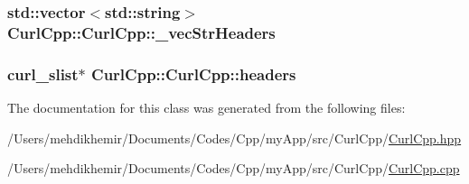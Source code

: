 \subsubsection[{\+\_\+vec\+Str\+Headers}]{\setlength{\rightskip}{0pt plus 5cm}std\+::vector$<$std\+::string$>$ Curl\+Cpp\+::\+Curl\+Cpp\+::\+\_\+vec\+Str\+Headers\hspace{0.3cm}{\ttfamily [private]}}\label{class_curl_cpp_1_1_curl_cpp_acd6960ca4b1abe99aa00bca6a24dcace}
\hypertarget{class_curl_cpp_1_1_curl_cpp_ada5ea161e25d1f657d0646067d843afc}{}
\subsubsection[{headers}]{\setlength{\rightskip}{0pt plus 5cm}curl\+\_\+slist$\ast$ Curl\+Cpp\+::\+Curl\+Cpp\+::headers\hspace{0.3cm}{\ttfamily [private]}}\label{class_curl_cpp_1_1_curl_cpp_ada5ea161e25d1f657d0646067d843afc}


The documentation for this class was generated from the following files\+:\begin{DoxyCompactItemize}
\item 
/\+Users/mehdikhemir/\+Documents/\+Codes/\+Cpp/my\+App/src/\+Curl\+Cpp/\hyperlink{_curl_cpp_8hpp}{Curl\+Cpp.\+hpp}\item 
/\+Users/mehdikhemir/\+Documents/\+Codes/\+Cpp/my\+App/src/\+Curl\+Cpp/\hyperlink{_curl_cpp_8cpp}{Curl\+Cpp.\+cpp}\end{DoxyCompactItemize}

